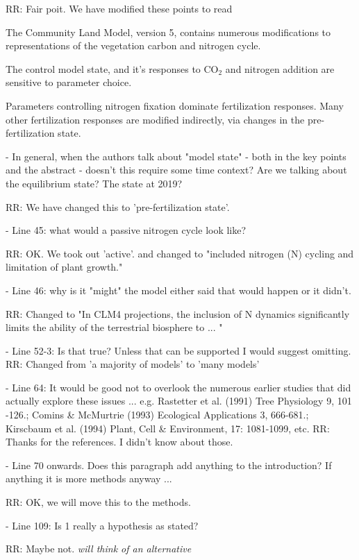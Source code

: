 \documentclass{article}
\begin{document}
RR: Fair poit. We have modified these points to read
\item The Community Land Model, version 5, contains numerous modifications to representations of the vegetation carbon and nitrogen cycle.

\item The control model state, and it's responses to CO$_{2}$ and nitrogen addition are sensitive to parameter choice.

\item Parameters controlling nitrogen fixation dominate fertilization responses. Many other fertilization responses are modified indirectly, via changes in the pre-fertilization state.


- In general, when the authors talk about "model state" - both in the key points and the abstract - doesn't this require some time context? Are we talking about the equilibrium state? The state at 2019? 

RR: We have changed this to 'pre-fertilization state'. 

- Line 45: what would a passive nitrogen cycle look like? 

RR: OK. We took out 'active'. and changed to "included nitrogen (N) cycling and limitation of plant growth."

- Line 46: why is it "might" the model either said that would happen or it didn't. 

RR: Changed to "In CLM4 projections, the inclusion of N dynamics significantly limits the ability of the terrestrial biosphere to ... "

- Line 52-3: Is that true? Unless that can be supported I would suggest omitting. 
RR: Changed from 'a majority of models' to 'many models'

- Line 64: It would be good not to overlook the numerous earlier studies that did actually explore these issues ... e.g. Rastetter et al. (1991) Tree Physiology 9, 101 -126.; Comins & McMurtrie (1993) Ecological Applications 3, 666-681.; Kirscbaum et al. (1994) Plant, Cell & Environment, 17: 1081-1099, etc. 
RR: Thanks for the references. I didn't know about those. 

- Line 70 onwards. Does this paragraph add anything to the introduction? If anything it is more methods anyway ... 

RR: OK, we will move this to the methods. 

- Line 109: Is 1 really a hypothesis as stated? 

RR: Maybe not. \emph{will think of an alternative}
\end{document}
